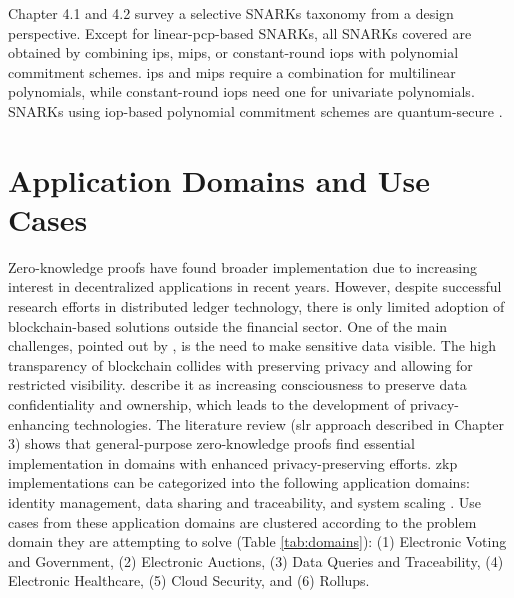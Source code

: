 Chapter 4.1 and 4.2 survey a selective SNARKs taxonomy from a design perspective. Except for linear-\acrshort{pcp}-based SNARKs, all SNARKs covered are obtained by combining \acrshort{ip}s, \acrshort{mip}s, or constant-round \acrshort{iop}s with polynomial commitment schemes. \acrshort{ip}s and \acrshort{mip}s require a combination for multilinear polynomials, while constant-round \acrshort{iop}s need one for univariate polynomials. SNARKs using \acrshort{iop}-based polynomial commitment schemes are quantum-secure \citep{Thaler}.

\section{Application Domains and Use Cases}
Zero-knowledge proofs have found broader implementation due to increasing interest in decentralized applications in recent years. However, despite successful research efforts in distributed ledger technology, there is only limited adoption of blockchain-based solutions outside the financial sector. One of the main challenges, pointed out by \citet{SedlmeirTransparencyChallenge}, is the need to make sensitive data visible. The high transparency of blockchain collides with preserving privacy and allowing for restricted visibility. \citet{Godden} describe it as increasing consciousness to preserve data confidentiality and ownership, which leads to the development of privacy-enhancing technologies. The literature review (\acrshort{slr} approach described in Chapter 3) shows that general-purpose zero-knowledge proofs find essential implementation in domains with enhanced privacy-preserving efforts. \acrshort{zkp} implementations can be categorized into the following application domains: identity management, data sharing and traceability, and system scaling \citep{PipeZK, chen2022review, morais2019survey}. Use cases from these application domains are clustered according to the problem domain they are attempting to solve (Table \ref{tab:domains}): (1) Electronic Voting and Government, (2) Electronic Auctions, (3) Data Queries and Traceability, (4) Electronic Healthcare, (5) Cloud Security, and (6) Rollups.

